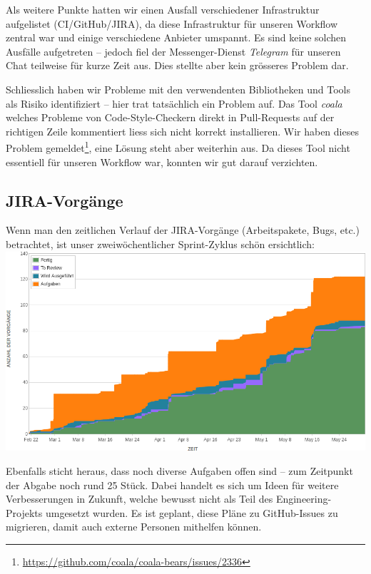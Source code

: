 \documentclass[a4paper]{article}
\begin{document}
Als weitere Punkte hatten wir einen Ausfall verschiedener Infrastruktur
aufgelistet (CI/GitHub/JIRA), da diese Infrastruktur für unseren Workflow
zentral war und einige verschiedene Anbieter umspannt. Es sind keine solchen
Ausfälle aufgetreten -- jedoch fiel der Messenger-Dienst \emph{Telegram} für
unseren Chat teilweise für kurze Zeit aus. Dies stellte aber kein grösseres
Problem dar.

Schliesslich haben wir Probleme mit den verwendenten Bibliotheken und Tools
als Risiko identifiziert -- hier trat tatsächlich ein Problem auf. Das Tool
\emph{coala} welches Probleme von Code-Style-Checkern direkt in
Pull-Requests auf der richtigen Zeile kommentiert liess sich nicht korrekt
installieren. Wir haben dieses Problem
gemeldet\footnote{\url{https://github.com/coala/coala-bears/issues/2336}}, eine
Lösung steht aber weiterhin aus. Da dieses Tool nicht essentiell für unseren
Workflow war, konnten wir gut darauf verzichten.

\subsection{JIRA-Vorgänge}

Wenn man den zeitlichen Verlauf der JIRA-Vorgänge (Arbeitspakete, Bugs, etc.)
betrachtet, ist unser zweiwöchentlicher Sprint-Zyklus schön ersichtlich: \\

\includegraphics[width=\linewidth]{img/issues.png}

Ebenfalls sticht heraus, dass noch diverse Aufgaben offen sind -- zum Zeitpunkt
der Abgabe noch rund 25 Stück. Dabei handelt es sich um Ideen für weitere
Verbesserungen in Zukunft, welche bewusst nicht als Teil des
Engineering-Projekts umgesetzt wurden. Es ist geplant, diese Pläne zu
GitHub-Issues zu migrieren, damit auch externe Personen mithelfen können.
\end{document}

